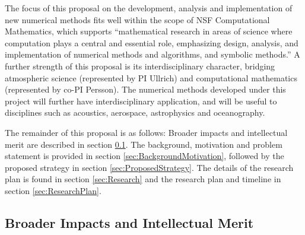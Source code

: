 \documentclass[11pt]{article}
\begin{document}
\vspace{-0.4cm}
The focus of this proposal on the development, analysis and implementation of new numerical methods fits well within the scope of NSF Computational Mathematics, which supports ``mathematical research in areas of science where computation plays a central and essential role, emphasizing design, analysis, and implementation of numerical methods and algorithms, and symbolic methods.''  A further strength of this proposal is its interdisciplinary character, bridging atmospheric science (represented by PI Ullrich) and computational mathematics (represented by co-PI Persson).  The numerical methods developed under this project will further have interdisciplinary application, and will be useful to disciplines such as acoustics, aerospace, astrophysics and oceanography.

The remainder of this proposal is as follows:  Broader impacts and intellectual merit are described in section \ref{sec:BroaderImpacts}.  The background, motivation and problem statement is provided in section \ref{sec:BackgroundMotivation}, followed by the proposed strategy in section \ref{sec:ProposedStrategy}.  The details of the research plan is found in section \ref{sec:Research} and the research plan and timeline in section \ref{sec:ResearchPlan}.

\subsection{Broader Impacts and Intellectual Merit} \label{sec:BroaderImpacts}
\end{document}
